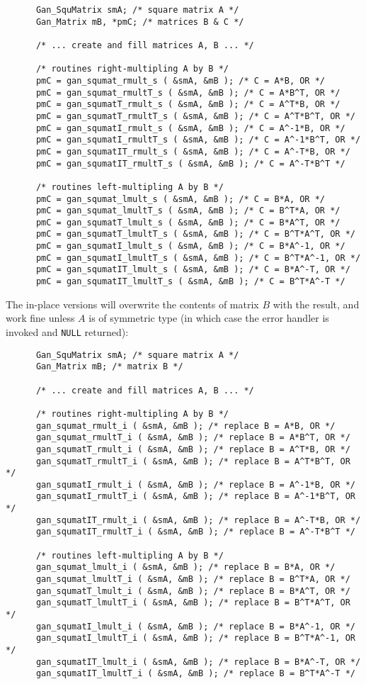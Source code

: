 \begin{verbatim}
      Gan_SquMatrix smA; /* square matrix A */
      Gan_Matrix mB, *pmC; /* matrices B & C */

      /* ... create and fill matrices A, B ... */

      /* routines right-multipling A by B */
      pmC = gan_squmat_rmult_s ( &smA, &mB ); /* C = A*B, OR */
      pmC = gan_squmat_rmultT_s ( &smA, &mB ); /* C = A*B^T, OR */
      pmC = gan_squmatT_rmult_s ( &smA, &mB ); /* C = A^T*B, OR */
      pmC = gan_squmatT_rmultT_s ( &smA, &mB ); /* C = A^T*B^T, OR */
      pmC = gan_squmatI_rmult_s ( &smA, &mB ); /* C = A^-1*B, OR */
      pmC = gan_squmatI_rmultT_s ( &smA, &mB ); /* C = A^-1*B^T, OR */
      pmC = gan_squmatIT_rmult_s ( &smA, &mB ); /* C = A^-T*B, OR */
      pmC = gan_squmatIT_rmultT_s ( &smA, &mB ); /* C = A^-T*B^T */

      /* routines left-multipling A by B */
      pmC = gan_squmat_lmult_s ( &smA, &mB ); /* C = B*A, OR */
      pmC = gan_squmat_lmultT_s ( &smA, &mB ); /* C = B^T*A, OR */
      pmC = gan_squmatT_lmult_s ( &smA, &mB ); /* C = B*A^T, OR */
      pmC = gan_squmatT_lmultT_s ( &smA, &mB ); /* C = B^T*A^T, OR */
      pmC = gan_squmatI_lmult_s ( &smA, &mB ); /* C = B*A^-1, OR */
      pmC = gan_squmatI_lmultT_s ( &smA, &mB ); /* C = B^T*A^-1, OR */
      pmC = gan_squmatIT_lmult_s ( &smA, &mB ); /* C = B*A^-T, OR */
      pmC = gan_squmatIT_lmultT_s ( &smA, &mB ); /* C = B^T*A^-T */
\end{verbatim}
The in-place versions will overwrite the contents of matrix $B$ with the
result, and work fine unless $A$ is of symmetric type (in which case the
error handler is invoked and {\tt NULL} returned):
\begin{verbatim}
      Gan_SquMatrix smA; /* square matrix A */
      Gan_Matrix mB; /* matrix B */

      /* ... create and fill matrices A, B ... */

      /* routines right-multipling A by B */
      gan_squmat_rmult_i ( &smA, &mB ); /* replace B = A*B, OR */
      gan_squmat_rmultT_i ( &smA, &mB ); /* replace B = A*B^T, OR */
      gan_squmatT_rmult_i ( &smA, &mB ); /* replace B = A^T*B, OR */
      gan_squmatT_rmultT_i ( &smA, &mB ); /* replace B = A^T*B^T, OR */
      gan_squmatI_rmult_i ( &smA, &mB ); /* replace B = A^-1*B, OR */
      gan_squmatI_rmultT_i ( &smA, &mB ); /* replace B = A^-1*B^T, OR */
      gan_squmatIT_rmult_i ( &smA, &mB ); /* replace B = A^-T*B, OR */
      gan_squmatIT_rmultT_i ( &smA, &mB ); /* replace B = A^-T*B^T */

      /* routines left-multipling A by B */
      gan_squmat_lmult_i ( &smA, &mB ); /* replace B = B*A, OR */
      gan_squmat_lmultT_i ( &smA, &mB ); /* replace B = B^T*A, OR */
      gan_squmatT_lmult_i ( &smA, &mB ); /* replace B = B*A^T, OR */
      gan_squmatT_lmultT_i ( &smA, &mB ); /* replace B = B^T*A^T, OR */
      gan_squmatI_lmult_i ( &smA, &mB ); /* replace B = B*A^-1, OR */
      gan_squmatI_lmultT_i ( &smA, &mB ); /* replace B = B^T*A^-1, OR */
      gan_squmatIT_lmult_i ( &smA, &mB ); /* replace B = B*A^-T, OR */
      gan_squmatIT_lmultT_i ( &smA, &mB ); /* replace B = B^T*A^-T */
\end{verbatim}
